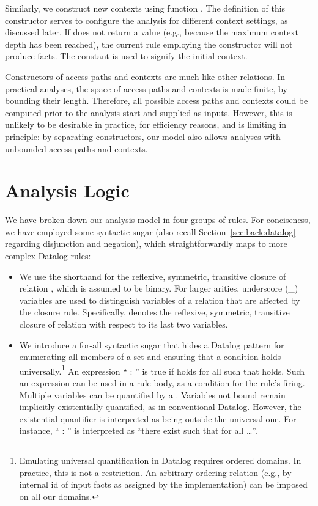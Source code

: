 Similarly, we construct new contexts using function . The definition of this constructor serves to configure the analysis for different context settings, as discussed later. If  does not return a value (e.g., because the maximum context depth has been reached), the current rule employing the constructor will not produce facts. The constant \ctxAll{} is used to signify the initial context.

Constructors of access paths and contexts are much like other relations. In practical analyses, the space of access paths and contexts is made finite, by bounding their length. Therefore, all possible access paths and contexts could be computed prior to the analysis start and supplied as inputs. However, this is unlikely to be desirable in practice, for efficiency reasons, and is limiting in principle: by separating constructors, our model also allows analyses with unbounded access paths and contexts.


\section{Analysis Logic}

We have broken down our analysis model in four groups of rules. For conciseness, we have employed some syntactic sugar (also recall Section~\ref{sec:back:datalog} regarding disjunction and negation), which straightforwardly maps to more complex Datalog rules:

\begin{itemize}
\item We use the shorthand  for the reflexive, symmetric, transitive closure of relation , which is assumed to be binary. For larger arities, underscore (\_) variables are used to distinguish variables of a relation that are affected by the closure rule. Specifically,  denotes the reflexive, symmetric, transitive closure of relation  with respect to its last two variables.

\item We introduce a for-all syntactic sugar that hides a Datalog pattern for enumerating all members of a set and ensuring that a condition holds universally.\footnote{Emulating universal quantification in Datalog requires ordered domains. In practice, this is not a restriction. An arbitrary ordering relation (e.g., by internal id of input facts as assigned by the implementation) can be imposed on all our domains.} An expression ``\dlforall{} :  \dlThen{} '' is true if  holds for all  such that  holds. Such an expression can be used in a rule body, as a condition for the rule's firing. Multiple variables can be quantified by a \dlforall{}. Variables not bound remain implicitly existentially quantified, as in conventional Datalog. However, the existential quantifier is interpreted as being outside the universal one. For instance, ``\dlforall{} :  \dlThen{} '' is interpreted as ``there exist  such that for all  \ldots''.
\end{itemize}



